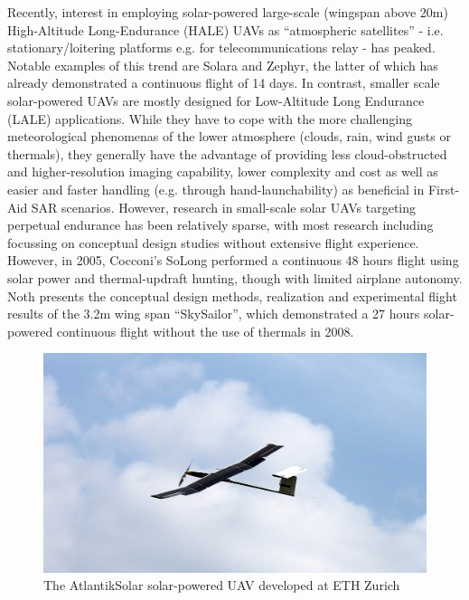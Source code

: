 Recently, interest in employing solar-powered large-scale (wingspan above 20m) High-Altitude Long-Endurance (HALE) UAVs as ``atmospheric satellites'' - i.e. stationary/loitering platforms e.g. for telecommunications relay - has peaked. Notable examples of this trend are Solara \cite{IEEE_AtmosphericSatellites} and Zephyr, the latter of which has already demonstrated a continuous flight of 14 days\cite{QinetiQ_Zephyr14dayRecord}. In contrast, smaller scale solar-powered UAVs are mostly designed for Low-Altitude Long Endurance (LALE) applications. While they have to cope with the more challenging meteorological phenomenas of the lower atmosphere (clouds, rain, wind gusts or thermals), they generally have the advantage of providing less cloud-obstructed and higher-resolution imaging capability, lower complexity and cost as well as easier and faster handling (e.g. through hand-launchability) as beneficial in First-Aid SAR scenarios. However, research in small-scale solar UAVs targeting perpetual endurance has been relatively sparse, with most research including \cite{Morton_ICRA2013} focussing on conceptual design studies without extensive flight experience. However, in 2005, Cocconi's SoLong \cite{Cocconi_SoLong} performed a continuous 48 hours flight using solar power and thermal-updraft hunting, though with limited airplane autonomy. Noth\cite{Noth_PhD} presents the conceptual design methods, realization and experimental flight results of the 3.2m wing span ``SkySailor'', which demonstrated a 27 hours solar-powered continuous flight without the use of thermals in 2008. 
\begin{figure}[b]
    \centering
    \includegraphics[width=\linewidth]{images/1_AtlantikSolarCollage}
    \caption{The AtlantikSolar solar-powered UAV developed at ETH Zurich}
    \label{fig:AtlantikSolarCollage}
\end{figure}

